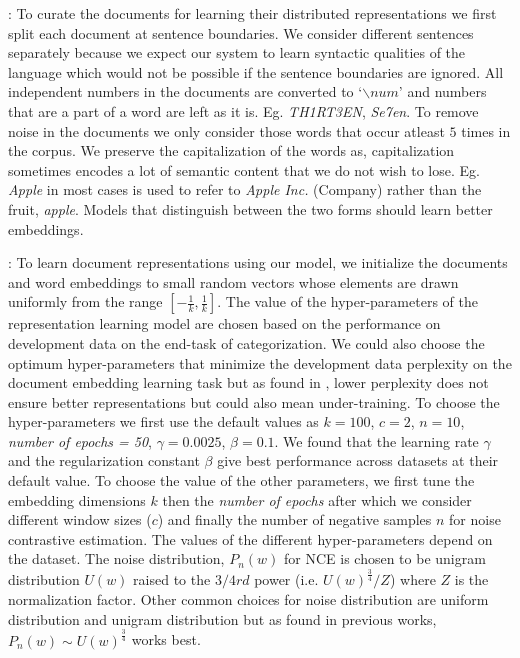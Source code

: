  : To curate the documents for learning their distributed representations we first split each document at sentence boundaries. We consider different sentences separately because we expect our system to learn syntactic qualities of the language which would not be possible if the sentence boundaries are ignored.
All independent numbers in the documents are converted to `$\backslash num$' and numbers that are a part of a word are left as it is. Eg. \emph{TH1RT3EN}, \emph{Se7en}. 
To remove noise in the documents we only consider those words that occur atleast $5$ times in the corpus.
We preserve the capitalization of the words as, capitalization sometimes encodes a lot of semantic content that we do not wish to lose. Eg. \emph{Apple} in most cases is used to refer to \emph{Apple Inc.} (Company) rather than the fruit, \emph{apple}. Models that distinguish between the two forms should learn better embeddings.

 : To learn document representations using our model, we initialize the documents and word embeddings to small random vectors whose elements are drawn uniformly from the range $[-\frac{1}{k}, \frac{1}{k}]$. 
The value of the hyper-parameters of the representation learning model are chosen based on the performance on development data on the end-task of categorization. 
We could also choose the optimum hyper-parameters that minimize the development data perplexity on the document embedding learning task but as found in \citep{mnih2013learning}, lower perplexity does not ensure better representations but could also mean under-training. 
To choose the hyper-parameters we first use the default values as $k = 100$, $c = 2$, $n = 10$, \emph{number of epochs = 50}, $\gamma = 0.0025$, $\beta = 0.1$. 
We found that the learning rate $\gamma$ and the regularization constant $\beta$ give best performance across datasets at their default value. To choose the value of the other parameters, we first tune the embedding dimensions $k$ then the \emph{number of epochs} after which we consider different window sizes ($c$) and finally the number of negative samples $n$ for noise contrastive estimation. The values of the different hyper-parameters depend on the dataset. 
The noise distribution, $P_{n}(w)$ for NCE is chosen to be unigram distribution $U(w)$ raised to the $3/4rd$ power (i.e. $U(w)^{\frac{3}{4}}/Z$) where $Z$ is the normalization factor. Other common choices for noise distribution are uniform distribution and unigram distribution but as found in previous works, $P_{n}(w) \sim U(w)^{\frac{3}{4}}$ works best.

